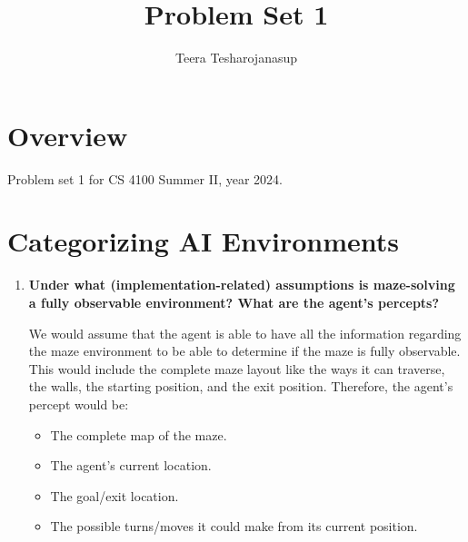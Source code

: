 \documentclass[a4paper]{article}
\begin{document}
\title{\textbf{\huge{Problem Set 1}}}

\author{\textbf\large{Teera Tesharojanasup}}


\date{}

\maketitle
\begin{sloppypar}

\section*{Overview}

Problem set 1 for CS 4100 Summer II, year 2024.

\section{Categorizing AI Environments}

\begin{enumerate}[start=1,label=Q\arabic*,left=0pt]
    \item \textbf{Under what (implementation-related) assumptions is maze-solving a fully observable environment? What are the agent’s percepts?}
    \par We would assume that the agent is able to have all the information regarding the maze environment to be able to determine if the maze
    is fully observable. 
    This would include the complete maze layout like the ways it can traverse, the walls, the starting position, and the exit position.
    Therefore, the agent's percept would be:
    \begin{itemize}
        \item The complete map of the maze.
        \item The agent's current location.
        \item The goal/exit location.
        \item The possible turns/moves it could make from its current position.
    \end{itemize}
    

\end{enumerate}
\end{sloppypar}
\end{document}
